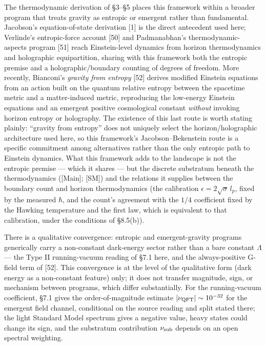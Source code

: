 \documentclass[
]{article}
\begin{document}
The thermodynamic derivation of §3--§5 places this framework within a
broader program that treats gravity as entropic or emergent rather than
fundamental. Jacobson's equation-of-state derivation {[}1{]} is the
direct antecedent used here; Verlinde's entropic-force account {[}50{]}
and Padmanabhan's thermodynamic-aspects program {[}51{]} reach
Einstein-level dynamics from horizon thermodynamics and holographic
equipartition, sharing with this framework both the entropic premise and
a holographic/boundary counting of degrees of freedom. More recently,
Bianconi's \emph{gravity from entropy} {[}52{]} derives modified
Einstein equations from an action built on the quantum relative entropy
between the spacetime metric and a matter-induced metric, reproducing
the low-energy Einstein equations and an emergent positive cosmological
constant \emph{without} invoking horizon entropy or holography. The
existence of this last route is worth stating plainly: ``gravity from
entropy'' does not uniquely select the horizon/holographic architecture
used here, so this framework's Jacobson--Bekenstein route is a specific
commitment among alternatives rather than the only entropic path to
Einstein dynamics. What this framework adds to the landscape is not the
entropic premise --- which it shares --- but the discrete substratum
beneath the thermodynamics ({[}Main{]}; {[}SM{]}) and the relations it
supplies between the boundary count and horizon thermodynamics (the
calibration \(\epsilon = 2\sqrt{\sigma}\,l_p\), fixed by the measured
\(\hbar\), and the count's agreement with the \(1/4\) coefficient fixed
by the Hawking temperature and the first law, which is equivalent to
that calibration, under the conditions of §8.5(b)).

There is a qualitative convergence: entropic and emergent-gravity
programs generically carry a non-constant dark-energy sector rather than
a bare constant \(\Lambda\) --- the Type II running-vacuum reading of
§7.1 here, and the always-positive G-field term of {[}52{]}. This
convergence is at the level of the qualitative form (dark energy as a
non-constant feature) only; it does not transfer magnitude, sign, or
mechanism between programs, which differ substantially. For the
running-vacuum coefficient, §7.1 gives the order-of-magnitude estimate
\(|\nu_{\rm QFT}|\sim10^{-32}\) for the emergent field channel,
conditional on the source reading and split stated there; the light
Standard Model spectrum gives a negative value, heavy states could
change its sign, and the substratum contribution \(\nu_{\rm sub}\)
depends on an open spectral weighting.
\end{document}
